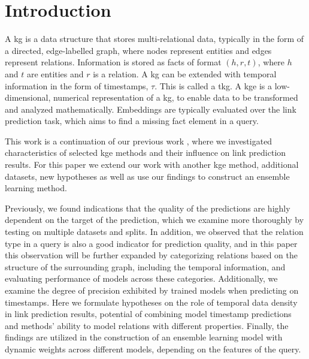 \section{Introduction}
\label{sec:introduction}

A \gls{kg} is a data structure that stores multi-relational data, typically in the form of a directed, edge-labelled graph, where nodes represent entities and edges represent relations.
Information is stored as facts of format $(h,r,t)$, where $h$ and $t$ are entities and $r$ is a relation.
A \gls{kg} can be extended with temporal information in the form of timestamps, $\tau$. This is called a \gls{tkg}.
A \gls{kge} is a low-dimensional, numerical representation of a \gls{kg}, to enable data to be transformed and analyzed mathematically.
Embeddings are typically evaluated over the link prediction task, which aims to find a missing fact element in a query.

This work is a continuation of our previous work \cite{P9}, where we investigated characteristics of selected \gls{kge} methods and their influence on link prediction results. For this paper we extend our work with another \gls{kge} method, additional datasets, new hypotheses as well as use our findings to construct an ensemble learning method.

Previously, we found indications that the quality of the predictions are highly dependent on the target of the prediction, which we examine more thoroughly by testing on multiple datasets and splits. In addition, we observed that the relation type in a query is also a good indicator for prediction quality, and in this paper this observation will be further expanded by categorizing relations based on the structure of the surrounding graph, including the temporal information, and evaluating performance of models across these categories. Additionally, we examine the degree of precision exhibited by trained models when predicting on timestamps.
Here we formulate hypotheses on the role of temporal data density in link prediction results, potential of combining model timestamp predictions and methods' ability to model relations with different properties.
Finally, the findings are utilized in the construction of an ensemble learning model with dynamic weights across different models, depending on the features of the query.

